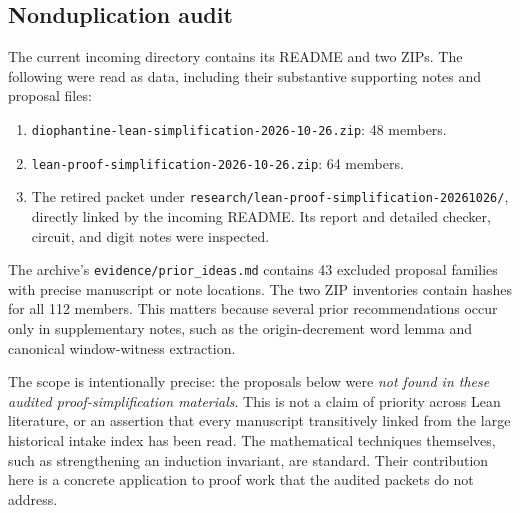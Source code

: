 \documentclass[11pt]{article}
\theoremstyle{remark}\newtheorem{remark}[theorem]{Remark}
\newcommand{\code}[1]{\nolinkurl{#1}}
\begin{document}
\subsection{Nonduplication audit}

The current incoming directory contains its README and two ZIPs. The following were read as data, including their substantive supporting notes and proposal files:

\begin{enumerate}
\item \code{diophantine-lean-simplification-2026-10-26.zip}: 48 members.
\item \code{lean-proof-simplification-2026-10-26.zip}: 64 members.
\item The retired packet under \code{research/lean-proof-simplification-20261026/}, directly linked by the incoming README. Its report and detailed checker, circuit, and digit notes were inspected.
\end{enumerate}

The archive's \code{evidence/prior_ideas.md} contains 43 excluded proposal families with precise manuscript or note locations. The two ZIP inventories contain hashes for all 112 members. This matters because several prior recommendations occur only in supplementary notes, such as the origin-decrement word lemma and canonical window-witness extraction.

The scope is intentionally precise: the proposals below were \emph{not found in these audited proof-simplification materials}. This is not a claim of priority across Lean literature, or an assertion that every manuscript transitively linked from the large historical intake index has been read. The mathematical techniques themselves, such as strengthening an induction invariant, are standard. Their contribution here is a concrete application to proof work that the audited packets do not address.
\end{document}
